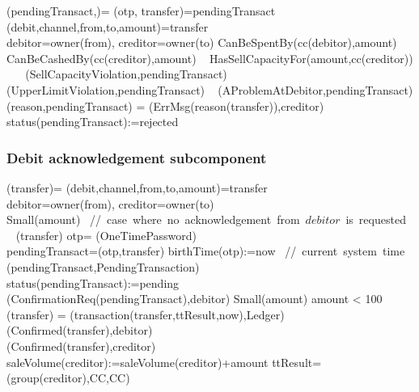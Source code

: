 \begin{asm}
(pendingTransact,)=\+
\LET (otp, transfer)=pendingTransact\\
 \LET (debit,channel,from,to,amount)=transfer\\
\LET debitor=owner(from), creditor=owner(to)\+
              \IF CanBeSpentBy(cc(debitor),amount) \+
                 \THEN ~ \IF CanBeCashedBy(cc(creditor),amount) \+
                    \THEN ~ \IF HasSellCapacityFor(amount,cc(creditor)) \+
                       \THEN ~  \-
                       \ELSE ~ 
                       (SellCapacityViolation,pendingTransact) \-
                 \ELSE ~ 
              (UpperLimitViolation,pendingTransact) \-
              \ELSE ~  
              (AProblemAtDebitor,pendingTransact) \dec\-
              \WHERE \+
              (reason,pendingTransact)  =\+
              (ErrMsg(reason(transfer)),\TO creditor)\\
              status(pendingTransact):=rejected 
\end{asm}
 
 
 \subsubsection{Debit acknowledgement subcomponent}
 
 \begin{asm}
 	(transfer)=\+
 	\LET (debit,channel,from,to,amount)=transfer \\
 	\LET debitor=owner(from), creditor=owner(to)\\
 	\IF Small(amount) 
 	\mbox{  // case where no acknowledgement from $debitor$ is requested}\+
 	\THEN ~ (transfer) \-
 	\ELSE \+
 	\LET otp= \NEW(OneTimePassword)\\
 	\LET pendingTransact=(otp,transfer)\+
 	birthTime(otp):=now \mbox{ // current system time}\\
 	(pendingTransact,PendingTransaction)\\ 
 	status(pendingTransact):=pending \\
 	(ConfirmationReq(pendingTransact),\TO debitor)
 	\dec\dec\-
 	\WHERE \+
 	Small(amount) \IFF amount < 100 \\
 	(transfer) =\+     
 	(transaction(transfer,ttResult,now),Ledger)\\
 	(Confirmed(transfer),\TO debitor)\\
 	(Confirmed(transfer),\TO creditor)\\
 	saleVolume(creditor):=saleVolume(creditor)+amount \-
 	ttResult=(group(creditor),CC,CC)
 \end{asm}
 
